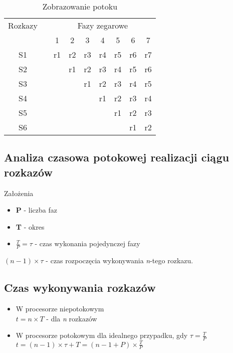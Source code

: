 	   	\begin{table}[htbp]
	   		\centering
	   		\caption{Zobrazowanie potoku}
	   		\begin{tabular}{|r|r|r|r|r|r|r|r|r|}
	   			\multicolumn{1}{r}{Rozkazy} & \multicolumn{1}{r}{} & \multicolumn{7}{c}{Fazy zegarowe} \\
	   			\multicolumn{1}{r}{} & \multicolumn{1}{r}{} & \multicolumn{1}{c}{1} & \multicolumn{1}{c}{2} & \multicolumn{1}{c}{3} & \multicolumn{1}{c}{4} & \multicolumn{1}{c}{5} & \multicolumn{1}{c}{6} & \multicolumn{1}{c}{7} \bigstrut[b]\\
	   			\cline{1-1}\cline{3-9}    \multicolumn{1}{|c|}{S1} &       & r1    & r2    & r3    & r4    & r5    & r6    & r7 \bigstrut\\
	   			\cline{1-1}\cline{3-9}    \multicolumn{1}{|c|}{S2} &       &       & r1    & r2    & r3    & r4    & r5    & r6 \bigstrut\\
	   			\cline{1-1}\cline{3-9}    \multicolumn{1}{|c|}{S3} &       &       &       & r1    & r2    & r3    & r4    & r5 \bigstrut\\
	   			\cline{1-1}\cline{3-9}    \multicolumn{1}{|c|}{S4} &       &       &       &       & r1    & r2    & r3    & r4 \bigstrut\\
	   			\cline{1-1}\cline{3-9}    \multicolumn{1}{|c|}{S5} &       &       &       &       &       & r1    & r2    & r3 \bigstrut\\
	   			\cline{1-1}\cline{3-9}    \multicolumn{1}{|c|}{S6} &       &       &       &       &       &       & r1    & r2 \bigstrut\\
	   			\cline{1-1}\cline{3-9}    \end{tabular}%
	   		\label{tab:addlabel}%
	   	\end{table}%
	   
   	\subsection{Analiza czasowa potokowej realizacji ciągu rozkazów}
   		Założenia
	   	\begin{itemize}
	   		\item \textbf{P} - liczba faz
	   		\item \textbf{T} - okres
	   		\item $\frac{T}{P}=\tau $ - czas wykonania pojedynczej fazy
	   	\end{itemize}
   		$(n-1)\times\tau$ - czas rozpoczęcia wykonywania \emph{n}-tego rozkazu.
   	\subsection{Czas wykonywania rozkazów}
	   	\begin{itemize}
	   		\item W procesorze niepotokowym\\
	   		$t=n\times T$ - dla \emph{n} rozkazów
	   		\item W procesorze potokowym dla idealnego przypadku, gdy $\tau=\frac{T}{P}$\\
	   		$t=(n-1)\times\tau+T=(n-1+P)\times\frac{T}{P}$
	   	\end{itemize}
